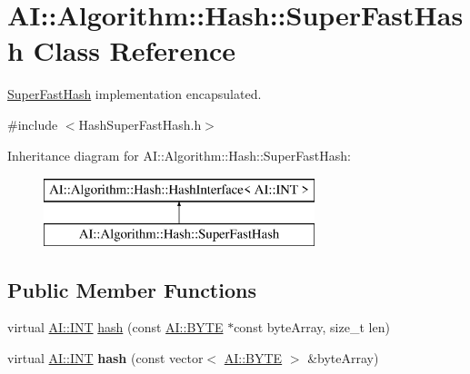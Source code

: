 \hypertarget{classAI_1_1Algorithm_1_1Hash_1_1SuperFastHash}{\section{A\+I\+:\+:Algorithm\+:\+:Hash\+:\+:Super\+Fast\+Hash Class Reference}
\label{classAI_1_1Algorithm_1_1Hash_1_1SuperFastHash}
}


\hyperlink{classAI_1_1Algorithm_1_1Hash_1_1SuperFastHash}{Super\+Fast\+Hash} implementation encapsulated.  




{\ttfamily \#include $<$Hash\+Super\+Fast\+Hash.\+h$>$}

Inheritance diagram for A\+I\+:\+:Algorithm\+:\+:Hash\+:\+:Super\+Fast\+Hash\+:\begin{figure}[H]
\begin{center}
\leavevmode
\includegraphics[height=2.000000cm]{classAI_1_1Algorithm_1_1Hash_1_1SuperFastHash}
\end{center}
\end{figure}
\subsection*{Public Member Functions}
\begin{DoxyCompactItemize}
\item 
virtual \hyperlink{namespaceAI_ac74584e573f07aa4194b461b1ba7be64}{A\+I\+::\+I\+N\+T} \hyperlink{classAI_1_1Algorithm_1_1Hash_1_1SuperFastHash_a242ccb7975bd45b30a945d9649170629}{hash} (const \hyperlink{namespaceAI_a9d4bcda82fe0f9aac3c4861e24491581}{A\+I\+::\+B\+Y\+T\+E} $\ast$const byte\+Array, size\+\_\+t len)
\item 
\hypertarget{classAI_1_1Algorithm_1_1Hash_1_1SuperFastHash_a08a5db31d857cc7706529d185827586a}{virtual \hyperlink{namespaceAI_ac74584e573f07aa4194b461b1ba7be64}{A\+I\+::\+I\+N\+T} {\bfseries hash} (const vector$<$ \hyperlink{namespaceAI_a9d4bcda82fe0f9aac3c4861e24491581}{A\+I\+::\+B\+Y\+T\+E} $>$ \&byte\+Array)}\label{classAI_1_1Algorithm_1_1Hash_1_1SuperFastHash_a08a5db31d857cc7706529d185827586a}

\end{DoxyCompactItemize}


